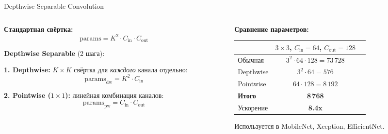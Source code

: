 \documentclass[aspectratio=169, 9pt]{beamer}
\begin{document}
\begin{frame}{Depthwise Separable Convolution}
  \begin{columns}[T]
    \begin{column}{0.55\textwidth}
      \textbf{Стандартная свёртка:}
      \[
      \text{params} = K^2 \cdot C_{\text{in}} \cdot C_{\text{out}}
      \]
      
      \textbf{Depthwise Separable} (2 шага):
      
      \textbf{1. Depthwise:} $K \times K$ свёртка для \textit{каждого} канала отдельно:
      \[
      \text{params}_{\text{dw}} = K^2 \cdot C_{\text{in}}
      \]
      
      \textbf{2. Pointwise ($1\times1$):} линейная комбинация каналов:
      \[
      \text{params}_{\text{pw}} = C_{\text{in}} \cdot C_{\text{out}}
      \]
    \end{column}
    \begin{column}{0.45\textwidth}
      \textbf{Сравнение параметров:}
      
      \begin{tabular}{lcc}
        \toprule
        & $3\times3$, $C_{\text{in}}=64$, $C_{\text{out}}=128$ \\
        \midrule
        Обычная & $3^2 \cdot 64 \cdot 128 = 73\,728$ \\
        Depthwise & $3^2 \cdot 64 = 576$ \\
        Pointwise & $64 \cdot 128 = 8\,192$ \\
        \textbf{Итого} & \textbf{8\,768} \\
        \midrule
        Ускорение & \textbf{8.4x} \\
        \bottomrule
      \end{tabular}
      
      \vspace{0.5em}
      Используется в MobileNet, Xception, EfficientNet.
    \end{column}
  \end{columns}
\end{frame}
\end{document}
